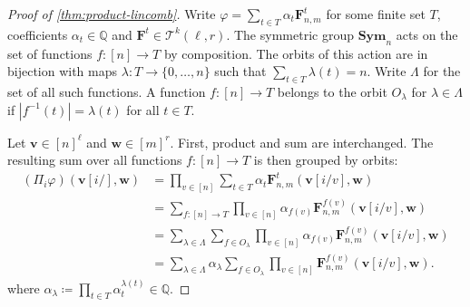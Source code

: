 \documentclass[11pt, DIV=15]{scrarticle}
\theoremstyle{definition}
\theoremstyle{plain}
\theoremstyle{remark}
\renewcommand{\phi}{\varphi}
\newcommand{\Sym}{\mathbf{Sym}}
\begin{document}
	
	\begin{proof}[Proof of \cref{thm:product-lincomb}]
		Write $\phi = \sum_{t \in T} \alpha_t \boldsymbol{F}^t_{n,m}$ for some finite set $T$,
		coefficients $\alpha_t \in \mathbb{Q}$ and $\boldsymbol{F}^t \in \mathcal{T}^k(\ell, r)$.
		The symmetric group $\Sym_n$ acts on the set of functions $f \colon [n] \to T$ by composition.
		The orbits of this action are in bijection with maps $\lambda \colon T \to \{0, \dots, n\}$ such that $\sum_{t\in T} \lambda(t) = n$.
		Write $\Lambda$ for the set of all such functions.
		A function $f \colon [n] \to T$ belongs to the orbit $O_\lambda$ for $\lambda \in \Lambda$ if $|f^{-1}(t)| = \lambda(t)$ for all $t \in T$.
		
		Let $\boldsymbol{v} \in [n]^\ell$ and $\boldsymbol{w} \in [m]^r$.
		First, product and sum are interchanged. The resulting sum over all functions $f \colon [n] \to T$ is then grouped by orbits:
		\begin{align*}
			(\Pi_i \phi)(\boldsymbol{v}[i/], \boldsymbol{w})
			&= \prod_{v \in [n]} \sum_{t \in T} \alpha_t \boldsymbol{F}_{n,m}^t(\boldsymbol{v}[i/v], \boldsymbol{w}) \\
			&= \sum_{f \colon [n] \to T} \prod_{v \in [n]} \alpha_{f(v)} \boldsymbol{F}_{n,m}^{f(v)}(\boldsymbol{v}[i/v], \boldsymbol{w}) \\
			&= \sum_{\lambda \in \Lambda} \sum_{f \in O_\lambda} \prod_{v \in [n]} \alpha_{f(v)} \boldsymbol{F}_{n,m}^{f(v)}(\boldsymbol{v}[i/v], \boldsymbol{w}) \\
			&= \sum_{\lambda \in \Lambda} \alpha_\lambda  \sum_{f \in O_\lambda} \prod_{v \in [n]} \boldsymbol{F}_{n,m}^{f(v)}(\boldsymbol{v}[i/v], \boldsymbol{w}).
		\end{align*}
		where $\alpha_\lambda \coloneqq \prod_{t \in T} \alpha_t^{\lambda(t)} \in \mathbb{Q}$.
		

\end{proof}
\end{document}
